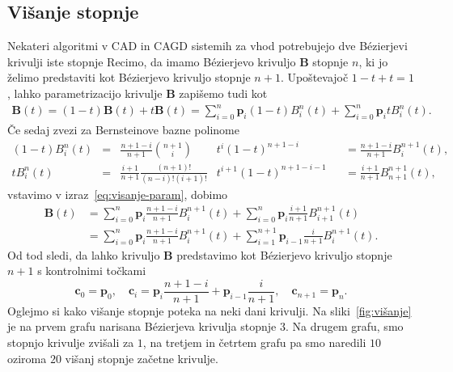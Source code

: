 \documentclass[isrm2, tisk]{fmfdelo}
\newcommand{\p}{\mathbf{p}}
\newcommand{\B}{\mathbf{B}}
\begin{document}
    \subsection{Višanje stopnje}
    Nekateri algoritmi v CAD in CAGD sistemih za vhod potrebujejo dve Bézierjevi krivulji iste stopnje
    Recimo, da imamo Bézierjevo krivuljo $\B$ stopnje $n$, ki jo želimo predstaviti kot Bézierjevo krivuljo stopnje $n+1$.
    Upoštevajoč $1-t+t=1$, lahko parametrizacijo krivulje $\B$ zapišemo tudi kot
    \begin{align}
        \B(t) = (1-t)\B(t)+t\B(t) = \sum_{i=0}^{n}\mathbf{p}_{i}(1-t)B_i^n(t) +\sum_{i=0}^{n}\mathbf{p}_{i}tB_i^n(t). \label{eq:visanje-param}
    \end{align}
    Če sedaj zvezi za Bernsteinove bazne polinome
    \begin{align*}
    (1-t)
        B_i^n(t) &= & \frac{n+1-i}{n+1} \binom{n+1}{i}&t^i(1-t)^{n+1-i} & &=\frac{n+1-i}{n+1}B_{i}^{n+1}(t), \\
        tB_i^n(t) &= & \frac{i+1}{n+1}\frac{(n+1)!}{(n-i)!(i+1)!}&t^{i+1}(1-t)^{n+1-i-1} & &= \frac{i+1}{n+1}B_{n+1}^{n+1}(t),
    \end{align*}
    vstavimo v izraz~\eqref{eq:visanje-param}, dobimo
    \begin{align*}
        \B(t) &= \sum_{i=0}^{n}\mathbf{p}_{i}\frac{n+1-i}{n+1}B_{i}^{n+1}(t) +\sum_{i=0}^{n}\mathbf{p}_{i}\frac{i+1}{n+1}B_{i+1}^{n+1}(t)\\
        &= \sum_{i=0}^{n}\mathbf{p}_{i}\frac{n+1-i}{n+1}B_{i}^{n+1}(t) +\sum_{i=1}^{n+1}\mathbf{p}_{i-1}\frac{i}{n+1}B_{i}^{n+1}(t).
    \end{align*}
    Od tod sledi, da lahko krivuljo $\B$ predstavimo kot Bézierjevo krivuljo stopnje $n+1$ s kontrolnimi točkami \[\mathbf{c}_0=\p_0, \quad \mathbf{c}_i=\mathbf{p}_{i}\frac{n+1-i}{n+1} + \mathbf{p}_{i-1}\frac{i}{n+1},\quad \mathbf{c}_{n+1}=\p_n. \]
    Oglejmo si kako višanje stopnje poteka na neki dani krivulji.
    Na sliki~\ref{fig:višanje} je na prvem grafu narisana Bézierjeva krivulja stopnje $3$.
    Na drugem grafu, smo stopnjo krivulje zvišali za $1$, na tretjem in četrtem grafu pa smo naredili $10$ oziroma $20$ višanj stopnje začetne krivulje.
\end{document}
